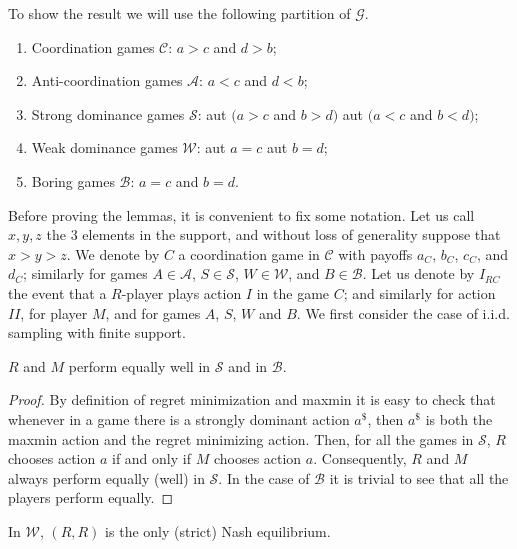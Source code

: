 \documentclass[fleqn,reqno,11pt]{article}
\begin{document}
\noindent To show
the result we will use the following partition of $\mathcal{G}$.
\begin{enumerate}
\item Coordination games $\mathcal{C}$: $a>c$ and $d>b$;
\item Anti-coordination games $\mathcal{A}$: $a<c$ and $d<b$;
\item Strong dominance games $\mathcal{S}$: aut $(a>c$ and $b>d)$
aut $(a<c$ and $b<d)$;
\item Weak dominance games $\mathcal{W}$: aut $a=c$ aut $b=d$;
\item Boring games $\mathcal{B}$: $a=c$ and $b=d$.
\end{enumerate}
Before proving the lemmas, it is convenient to fix some notation. Let us call $x,y,z$ the 3 elements in the support, and without loss of generality suppose that $ x > y > z $. 
We denote by $C$ a coordination game in $\mathcal{C}$ with
payoffs $a_{C}$, $b_{C}$, $c_{C}$, and $d_{C}$;
similarly for games $A \in \mathcal{A}$, $S \in \mathcal{S}$, $W \in \mathcal{W}$, and $B \in \mathcal{B}$. 
Let us denote by $I_{RC}$ the event that a $R$-player plays action $I$ in the game $C$; and similarly for action $II$, for player $M$, and for games $A$, $S$, $W$ and $B$. We first consider the case of i.i.d. sampling with finite support.


\medskip{}


\begin{lemma} \label{lemma:S-B games}
$R$ and $M$ perform equally well in $\mathcal{S}$
and in $\mathcal{B}$. 
\end{lemma}

\begin{proof}
By definition of regret minimization and maxmin it
is easy to check that whenever in a game there is a strongly dominant
action $a^{\$}$, then $a^{\$}$ is both the maxmin action and the
regret minimizing action. Then, for all the games in $\mathcal{S}$,
$R$ chooses action $a$ if and only if $M$ chooses action $a$. Consequently,
$R$ and $M$ always perform equally (well) in $\mathcal{S}$. In
the case of $\mathcal{B}$ it is trivial to see that all the players
perform equally.
\end{proof}

\medskip{}

\begin{lemma} \label{lemma:W games}
In $\mathcal{W}$, $(R,R)$ is the only (strict) Nash equilibrium.
\end{lemma}
\end{document}
